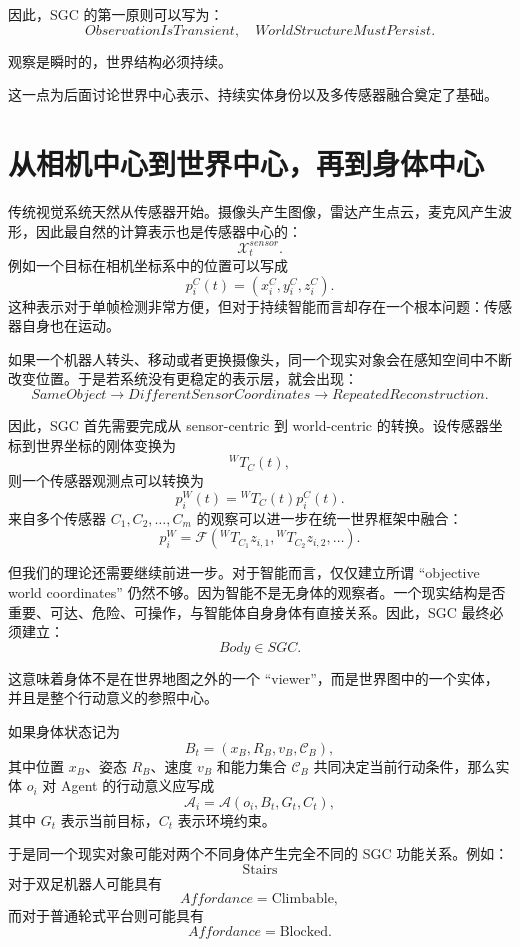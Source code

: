 因此，SGC 的第一原则可以写为：
\[
\boxed{
ObservationIsTransient,\quad
WorldStructureMustPersist.
}
\]

观察是瞬时的，世界结构必须持续。

这一点为后面讨论世界中心表示、持续实体身份以及多传感器融合奠定了基础。

\section{从相机中心到世界中心，再到身体中心}

传统视觉系统天然从传感器开始。摄像头产生图像，雷达产生点云，麦克风产生波形，因此最自然的计算表示也是传感器中心的：
\[
\mathcal{X}^{sensor}_t.
\]
例如一个目标在相机坐标系中的位置可以写成
\[
p_i^{C}(t)
=
(x_i^C,y_i^C,z_i^C).
\]
这种表示对于单帧检测非常方便，但对于持续智能而言却存在一个根本问题：传感器自身也在运动。

如果一个机器人转头、移动或者更换摄像头，同一个现实对象会在感知空间中不断改变位置。于是若系统没有更稳定的表示层，就会出现：
\[
SameObject
\rightarrow
DifferentSensorCoordinates
\rightarrow
RepeatedReconstruction.
\]

因此，SGC 首先需要完成从 sensor-centric 到 world-centric 的转换。设传感器坐标到世界坐标的刚体变换为
\[
{}^{W}T_{C}(t),
\]
则一个传感器观测点可以转换为
\[
p_i^{W}(t)
=
{}^{W}T_{C}(t)p_i^{C}(t).
\]
来自多个传感器 \(C_1,C_2,\ldots,C_m\) 的观察可以进一步在统一世界框架中融合：
\[
p_i^{W}
=
\mathcal{F}
\left(
{}^{W}T_{C_1}z_{i,1},
{}^{W}T_{C_2}z_{i,2},
\ldots
\right).
\]

但我们的理论还需要继续前进一步。对于智能而言，仅仅建立所谓 ``objective world coordinates'' 仍然不够。因为智能不是无身体的观察者。一个现实结构是否重要、可达、危险、可操作，与智能体自身身体有直接关系。因此，SGC 最终必须建立：
\[
\boxed{
Body\in SGC.
}
\]

这意味着身体不是在世界地图之外的一个 ``viewer''，而是世界图中的一个实体，并且是整个行动意义的参照中心。

如果身体状态记为
\[
B_t
=
\left(
x_B,
R_B,
v_B,
\mathcal{C}_B
\right),
\]
其中位置 \(x_B\)、姿态 \(R_B\)、速度 \(v_B\) 和能力集合 \(\mathcal{C}_B\) 共同决定当前行动条件，那么实体 \(o_i\) 对 Agent 的行动意义应写成
\[
\mathcal{A}_i
=
\mathcal{A}
\left(
o_i,
B_t,
G_t,
C_t
\right),
\]
其中 \(G_t\) 表示当前目标，\(C_t\) 表示环境约束。

于是同一个现实对象可能对两个不同身体产生完全不同的 SGC 功能关系。例如：
\[
\text{Stairs}
\]
对于双足机器人可能具有
\[
Affordance=\text{Climbable},
\]
而对于普通轮式平台则可能具有
\[
Affordance=\text{Blocked}.
\]

